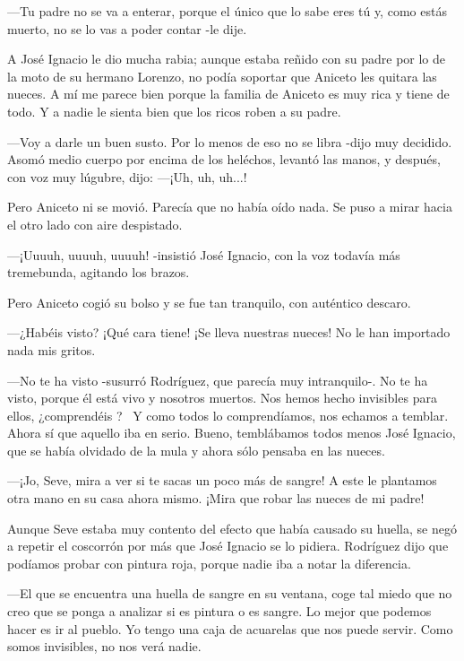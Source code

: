 \documentclass{barcodevapor3pags}
\begin{document}
---Tu padre no se va a enterar, porque el único que lo sabe eres tú y,
como estás muerto, no se lo vas a poder contar -le dije.~

A José Ignacio le dio mucha rabia; aunque estaba reñido con su padre por
lo de la moto de su hermano Lorenzo, no podía soportar que Aniceto les
quitara las nueces. A mí me parece bien porque la familia de Aniceto es
muy rica y tiene de todo. Y a nadie le sienta bien que los ricos roben a
su padre.~

---Voy a darle un buen susto. Por lo menos de eso no se libra -dijo muy
decidido. Asomó medio cuerpo por encima de los heléchos, levantó las
manos, y después, con voz muy lúgubre, dijo: ---¡Uh, uh, uh...!~



Pero Aniceto ni se movió. Parecía que no había oído nada. Se puso a
mirar hacia el otro lado con aire despistado.~

---¡Uuuuh, uuuuh, uuuuh! -insistió José Ignacio, con la voz todavía más
tremebunda, agitando los brazos.~

Pero Aniceto cogió su bolso y se fue tan tranquilo, con auténtico
descaro.~

---¿Habéis visto? ¡Qué cara tiene! ¡Se lleva nuestras nueces! No le han
importado nada mis gritos.~

---No te ha visto -susurró Rodríguez, que parecía muy intranquilo-. No
te ha visto, porque él está vivo y nosotros muertos. Nos hemos hecho
invisibles para ellos, ¿comprendéis ?~
Y como todos lo comprendíamos, nos echamos a temblar. Ahora sí que
aquello iba en serio. Bueno, temblábamos todos menos José Ignacio, que
se había olvidado de la mula y ahora sólo pensaba en las nueces.~

---¡Jo, Seve, mira a ver si te sacas un poco más de sangre! A este le
plantamos otra mano en su casa ahora mismo. ¡Mira que robar las nueces
de mi padre!~

Aunque Seve estaba muy contento del efecto que había causado su huella,
se negó a repetir el coscorrón por más que José Ignacio se lo pidiera.
Rodríguez dijo que podíamos probar con pintura roja, porque nadie iba a
notar la diferencia.~

---El que se encuentra una huella de sangre en su ventana, coge tal
miedo que no creo que se ponga a analizar si es pintura o es sangre. Lo
mejor que podemos hacer es ir al pueblo. Yo tengo una caja de acuarelas
que nos puede servir. Como somos invisibles, no nos verá nadie.~
\end{document}
